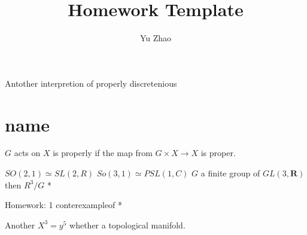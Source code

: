 \documentclass[12pt]{article}
\begin{document}


\title{Homework Template}%
\author{Yu Zhao} %

\maketitle
Antother interpretion of properly discretenious

\section{name}
\label{sec:label}

$G$ acts on $X$ is properly if the map from $G\times X\to X$ is proper.

$SO(2,1)\simeq SL(2,R)$
$So(3,1)\simeq PSL(1,C)$
$G$ a finite group of $GL(3, \mathbf{R})$then $R^3/G$ *

Homework: 1 conterexampleof *

Another $X^3=y^5$ whether a topological manifold.
\end{document}
